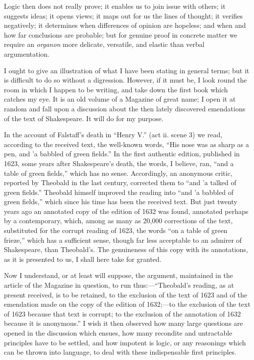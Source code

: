 Logic then does not really prove; it enables us to join issue with
others; it suggests ideas; it opens views; it maps out for us the
lines of thought; it verifies negatively; it determines when
differences of opinion are hopeless; and when and how far conclusions
are probable; but for genuine proof in concrete matter we require an \emph{organon}
more delicate, versatile, and elastic than verbal argumentation.

I ought to give an illustration of what I have been stating in
general terms; but it is difficult to do so without a digression.
However, if it must be, I look round the room in which I happen to be
writing, and take down the first book which catches my eye. It is an
old volume of a Magazine of great name; I open it at random and fall
upon a discussion about the then lately discovered emendations of the
text of Shakespeare. It will do for my purpose.

In the account of Falstaff's death in ``Henry V.'' (act ii.
scene 3) we read, according to the received text, the well-known
words, ``His nose was as sharp as a pen, and 'a babbled of green
fields.'' In the first authentic edition, published in 1623, some
years after Shakespeare's death, the words, I believe, ran, ``and
a table of green fields,'' which has no sense. Accordingly, an
anonymous critic, reported by Theobald in the last century, corrected
them to ``and 'a talked of green fields.'' Theobald himself
improved the reading into ``and 'a babbled of green fields,''
which since his time has been the received text. But just twenty
years ago an annotated copy of the edition of 1632 was found,
annotated perhaps by a contemporary, which, among as many as 20,000
corrections of the text, substituted for the corrupt reading of 1623,
the words ``on a table of green frieze,'' which has a
sufficient sense, though far less acceptable to an admirer of
Shakespeare, than Theobald's. The genuineness of this copy with its
annotations, as it is presented to us, I shall here take for granted.

Now I understand, or at least will suppose, the argument,
maintained in the article of the Magazine in question, to run thus:—``Theobald's
reading, as at present received, is to be retained, to the exclusion
of the text of 1623 and of the emendation made on the copy of the
edition of 1632;—to the exclusion of the text of 1623 because that
text is corrupt; to the exclusion of the annotation of 1632 because it
is anonymous.'' I wish it then observed how many large questions
are opened in the discussion which ensues, how many recondite and
untractable principles have to be settled, and how impotent is logic,
or any reasonings which can be thrown into language, to deal with
these indispensable first principles.

